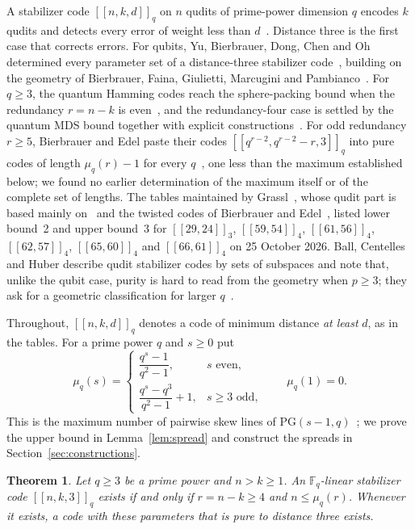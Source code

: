 \documentclass[11pt]{amsart}
\newtheorem{theorem}{Theorem}[section]
\theoremstyle{definition}
\theoremstyle{remark}
\newcommand{\F}{\mathbb F}
\newcommand{\qq}[1]{[\![#1]\!]}
\begin{document}
A stabilizer code $\qq{n,k,d}_q$ on $n$ qudits of prime-power dimension $q$ encodes $k$ qudits and detects every error of weight less than $d$~\cite{AshikhminKnill2001,KKKS2006}. Distance three is the first case that corrects errors. For qubits, Yu, Bierbrauer, Dong, Chen and Oh determined every parameter set of a distance-three stabilizer code~\cite{YuEtAl2013}, building on the geometry of Bierbrauer, Faina, Giulietti, Marcugini and Pambianco~\cite{BFGMP2008}. For $q\ge3$, the quantum Hamming codes reach the sphere-packing bound when the redundancy $r=n-k$ is even~\cite{BierbrauerEdel2000,KKKS2006}, and the redundancy-four case is settled by the quantum MDS bound together with explicit constructions~\cite{HuberGrassl2020,LiXu2010,GrasslRoetteler2015}. For odd redundancy $r\ge5$, Bierbrauer and Edel paste their codes $\qq{q^{r-2},q^{r-2}-r,3}_q$ into pure codes of length $\mu_q(r)-1$ for every $q$~\cite[Theorems~9, 11 and~12]{BierbrauerEdel2000}, one less than the maximum established below; we found no earlier determination of the maximum itself or of the complete set of lengths. The tables maintained by Grassl~\cite{codetables}, whose qudit part is based mainly on~\cite{EzermanEtAl2024} and the twisted codes of Bierbrauer and Edel~\cite{BierbrauerEdel2000}, listed lower bound~2 and upper bound~3 for $\qq{29,24}_3$, $\qq{59,54}_4$, $\qq{61,56}_4$, $\qq{62,57}_4$, $\qq{65,60}_4$ and $\qq{66,61}_4$ on 25 October 2026. Ball, Centelles and Huber describe qudit stabilizer codes by sets of subspaces and note that, unlike the qubit case, purity is hard to read from the geometry when $p\ge3$; they ask for a geometric classification for larger $q$~\cite[Research Problem~4]{BallCentellesHuber2023}.

Throughout, $\qq{n,k,d}_q$ denotes a code of minimum distance \emph{at least} $d$, as in the tables. For a prime power $q$ and $s\ge0$ put
\begin{equation}\label{eq:mu}
\mu_q(s)=\begin{cases}\dfrac{q^s-1}{q^2-1}, & s\text{ even},\\[2mm] \dfrac{q^s-q^3}{q^2-1}+1, & s\ge3\text{ odd},\end{cases}\qquad \mu_q(1)=0 .
\end{equation}
This is the maximum number of pairwise skew lines of $\mathrm{PG}(s-1,q)$~\cite{Beutelspacher1975,NastaseSissokho2017}; we prove the upper bound in Lemma~\ref{lem:spread} and construct the spreads in Section~\ref{sec:constructions}.

\begin{theorem}\label{thm:main}
Let $q\ge3$ be a prime power and $n>k\ge1$. An $\F_q$-linear stabilizer code $\qq{n,k,3}_q$ exists if and only if $r=n-k\ge4$ and $n\le\mu_q(r)$. Whenever it exists, a code with these parameters that is pure to distance three exists.
\end{theorem}
\end{document}
